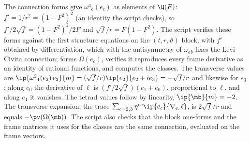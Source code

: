 The connection forms give $\omega^{a}{}_{b}(e_{c})$ as elements of $\Q(F)$: $f' = 1/r^{2} = (1 - F^{2})^{2}$ (an identity the script checks), so $f'/2\sqrt f = (1 - F^{2})^{2}/2F$ and $\sqrt f/r = F(1 - F^{2})$. The script verifies these forms against the first structure equations on the $(t, r, \vartheta)$ block, with $f'$ obtained by differentiation, which with the antisymmetry of $\omega_{ab}$ fixes the Levi-Civita connection; forms $\Omega(e_{c})$, verifies it reproduces every frame derivative as an identity of rational functions, and computes the classes. The transverse values are $\ip{\omega^{2}{}_{1}(e_{2})\,e_{2}}{m} = (\sqrt f/r)\ip{e_{2}}{e_{2} + ie_{3}} = -\sqrt f/r$ and likewise for $e_{3}$; along $e_{0}$ the derivative of $\ell$ is $(f'/2\sqrt f)(e_{1} + e_{0})$, proportional to $\ell$, and along $e_{1}$ it vanishes. The tetrad values follow by linearity, $\ip{\mb}{m} = -2$. The transverse expansion, the trace $\sum_{c = 2,3}\eta^{cc}\ip{e_{c}}{\nabla_{e_{c}}\ell}$, is $2\sqrt f/r$ and equals $-\pv(\Omega(\mb))$. The script also checks that the block one-forms and the frame matrices it uses for the classes are the same connection, evaluated on the frame vectors.
